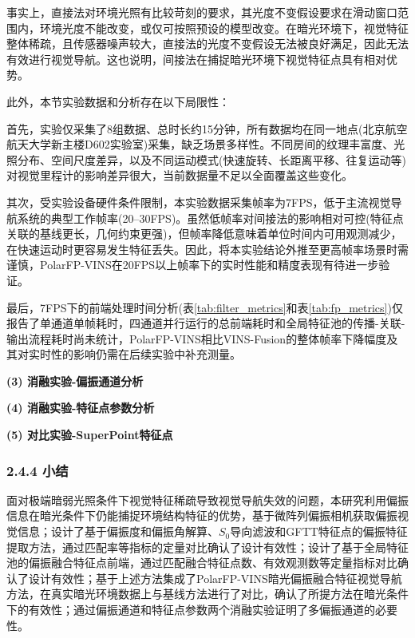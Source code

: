 事实上，直接法对环境光照有比较苛刻的要求，其光度不变假设要求在滑动窗口范围内，环境光度不能改变，或仅可按照预设的模型改变。在暗光环境下，视觉特征整体稀疏，且传感器噪声较大，直接法的光度不变假设无法被良好满足，因此无法有效进行视觉导航。这也说明，间接法在捕捉暗光环境下视觉特征点具有相对优势。

此外，本节实验数据和分析存在以下局限性：

首先，实验仅采集了8组数据、总时长约15分钟，所有数据均在同一地点(北京航空航天大学新主楼D602实验室)采集，缺乏场景多样性。不同房间的纹理丰富度、光照分布、空间尺度差异，以及不同运动模式(快速旋转、长距离平移、往复运动等)对视觉里程计的影响差异很大，当前数据量不足以全面覆盖这些变化。

其次，受实验设备硬件条件限制，本实验数据采集帧率为7FPS，低于主流视觉导航系统的典型工作帧率(20--30FPS)。虽然低帧率对间接法的影响相对可控(特征点关联的基线更长，几何约束更强)，但帧率降低意味着单位时间内可用观测减少，在快速运动时更容易发生特征丢失。因此，将本实验结论外推至更高帧率场景时需谨慎，PolarFP-VINS在20FPS以上帧率下的实时性能和精度表现有待进一步验证。

最后，7FPS下的前端处理时间分析(表\ref{tab:filter_metrics}和表\ref{tab:fp_metrics})仅报告了单通道单帧耗时，四通道并行运行的总前端耗时和全局特征池的传播-关联-输出流程耗时尚未统计，PolarFP-VINS相比VINS-Fusion的整体帧率下降幅度及其对实时性的影响仍需在后续实验中补充测量。

\textbf{(3) 消融实验-偏振通道分析}

\textbf{(4) 消融实验-特征点参数分析}

\textbf{(5) 对比实验-SuperPoint特征点}

\subsubsection*{2.4.4 小结}

面对极端暗弱光照条件下视觉特征稀疏导致视觉导航失效的问题，本研究利用偏振信息在暗光条件下仍能捕捉环境结构特征的优势，基于微阵列偏振相机获取偏振视觉信息；设计了基于偏振度和偏振角解算、$S_0$导向滤波和GFTT特征点的偏振特征提取方法，通过匹配率等指标的定量对比确认了设计有效性；设计了基于全局特征池的偏振融合特征点前端，通过匹配融合特征点数、有效观测数等定量指标对比确认了设计有效性；基于上述方法集成了PolarFP-VINS暗光偏振融合特征视觉导航方法，在真实暗光环境数据上与基线方法进行了对比，确认了所提方法在暗光条件下的有效性；通过偏振通道和特征点参数两个消融实验证明了多偏振通道的必要性。
